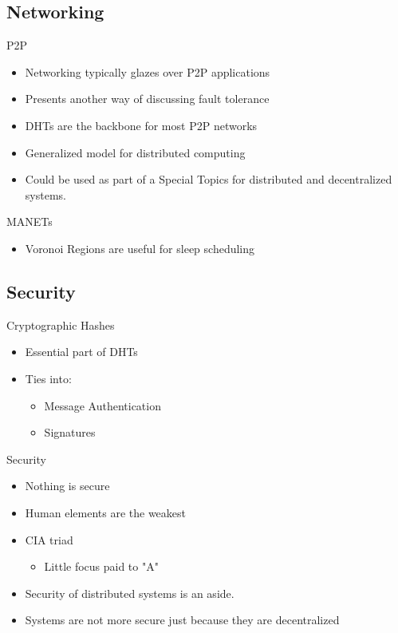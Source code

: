 \documentclass[11pt]{beamer}
\begin{document}
\subsection{Networking}

\begin{frame}{P2P}
	\begin{itemize}
		\item Networking typically glazes over P2P applications
		\item Presents another way of discussing fault tolerance
		\item DHTs are the backbone for most P2P networks
		\item Generalized model for distributed computing
		\item Could be used as part of a Special Topics for distributed and decentralized systems.
	\end{itemize}
\end{frame}




\begin{frame}{MANETs}
\begin{itemize}
	\item Voronoi Regions are useful for sleep scheduling
\end{itemize}
\end{frame}

\subsection{Security}


\begin{frame}{Cryptographic Hashes}
	\begin{itemize}
		
	\item Essential part of DHTs
	\item Ties into:
	\begin{itemize}
		\item Message Authentication
		\item Signatures
	\end{itemize}
	\end{itemize}
	
\end{frame}


\begin{frame}{Security}
	\begin{itemize}
		\item Nothing is secure
		\item Human elements are the weakest
		\item CIA triad
		\begin{itemize}
			\item Little focus paid to "A"
			
		\end{itemize}
		\item Security of distributed systems is an aside.
		\item Systems are not more secure just because they are decentralized
		
	\end{itemize}
	
\end{frame}
\end{document}
